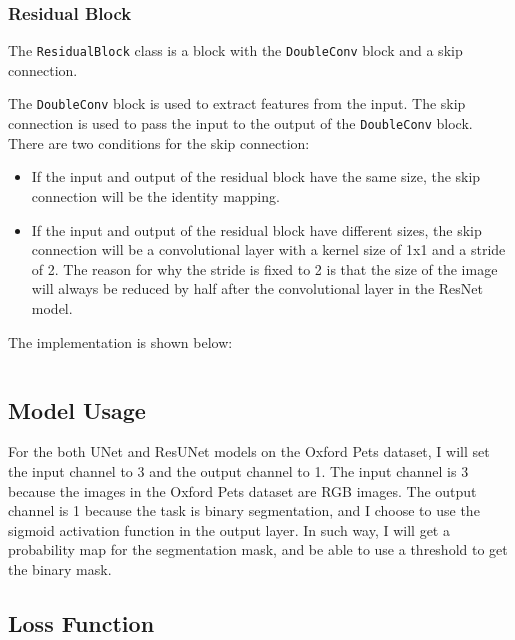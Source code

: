 \inputminted[firstline=4, highlightlines={16,21}]{python}{../src/models/common.py}

\subsubsection{Residual Block}
\label{sec:residual_block}

The \texttt{ResidualBlock} class is a block with the \texttt{DoubleConv} block and a skip connection.

The \texttt{DoubleConv} block is used to extract features from the input.
The skip connection is used to pass the input to the output of the \texttt{DoubleConv} block.
There are two conditions for the skip connection:
\begin{itemize}
    \item If the input and output of the residual block have the same size, the skip connection will be the identity mapping.
    \item If the input and output of the residual block have different sizes, the skip connection will be a convolutional layer with a kernel size of 1x1 and a stride of 2.
          The reason for why the stride is fixed to 2 is that the size of the image will always be reduced by half after the convolutional layer in the ResNet model.
\end{itemize}

The implementation is shown below:

\inputminted[firstline=7, lastline=20]{python}{../src/models/resnet34_unet.py}

\subsection{Model Usage}

For the both UNet and ResUNet models on the Oxford Pets dataset, I will set the input channel to 3 and the output channel to 1.
The input channel is 3 because the images in the Oxford Pets dataset are RGB images.
The output channel is 1 because the task is binary segmentation, and I choose to use the sigmoid activation function in the output layer.
In such way, I will get a probability map for the segmentation mask, and be able to use a threshold to get the binary mask.

\subsection{Loss Function}
\label{sec:loss_function}

